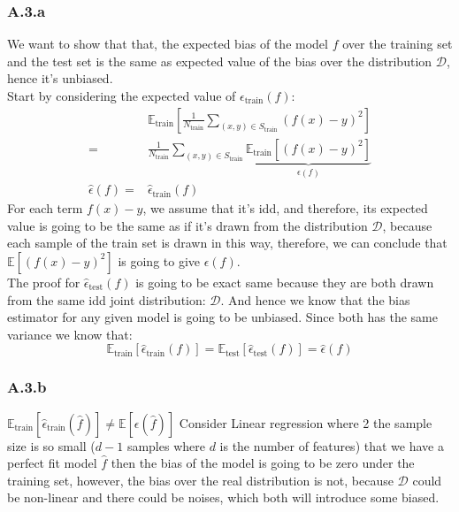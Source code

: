 \documentclass[]{article}
\begin{document}
    \subsubsection*{A.3.a}
        We want to show that that, the expected bias of the model $f$ over the training set and the test set is the same as expected value of the bias over the distribution $\mathcal{D}$, hence it's unbiased. 
        \\[1em]
        Start by considering the expected value of $\epsilon_\text{train}(f)$: 
        \begin{align*}\tag{A.3.a.1}\label{eqn:A.3.a.1}
            & \mathbb{E}_{\text{train}}\left[\frac{1}{N_\text{train}}
            \sum_{(x, y)\in S_\text{train}}^{}\left(
                f(x) - y
            \right)^2\right]
            \\
            = &
            \frac{1}{N_\text{train}} 
            \sum_{(x, y)\in S_\text{train}}^{}
            \underbrace{
                \mathbb{E}_{\text{train}}
                \left[ 
                \left(
                    f(x) - y
                \right)^2\right]
            }_{\epsilon(f)}
            \\
            \hat{\epsilon}(f)
            = &
            \hat{\epsilon}_{\text{train}}(f)
        \end{align*}
        For each term $f(x) - y$, we assume that it's idd, and therefore, its expected value is going to be the same as if it's drawn from the distribution $\mathcal{D}$, because each sample of the train set is drawn in this way, therefore, we can conclude that $\mathbb{E}\left[(f(x) - y)^2\right]$ is going to give $\epsilon(f)$. 
        \\[1em]
        The proof for $\hat{\epsilon}_\text{test}(f)$ is going to be exact same because they are both drawn from the same idd joint distribution: $\mathcal{D}$. And hence we know that the bias estimator for any given model is going to be unbiased. Since both has the same variance we know that: 
        \begin{equation*}\tag{A.3.a.2}\label{eqn:A.3.a.2}
            \mathbb{E}_\text{train}\left[\hat{\epsilon}_\text{train}(f)\right]
            =
            \mathbb{E}_\text{test}\left[\hat{\epsilon}_\text{test}(f)\right]
            =
            \hat{\epsilon}(f) 
        \end{equation*}
    \subsubsection*{A.3.b}
        $\mathbb{E}_{\text{train}}\left[\hat{\epsilon}_\text{train}(\hat{f})\right]\ne \mathbb{E}\left[\epsilon(\hat{f})\right]$ Consider Linear regression where 2 the sample size is so small ($d - 1$ samples where $d$ is the number of features) that we have a perfect fit model $\hat{f}$ then the bias of the model is going to be zero under the training set, however, the bias over the real distribution is not, because $\mathcal{D}$ could be non-linear and there could be noises, which both will introduce some biased. 
\end{document}
